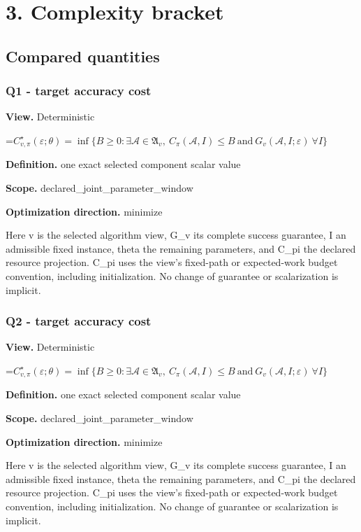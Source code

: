 \documentclass[10pt,a4paper]{article}
\newcommand{\AtlasMath}[1]{\par\begingroup\centering\setbox0=\hbox{$\displaystyle #1$}\ifdim\wd0>1.4\linewidth\typeout{ATLAS WIDE FORMULA: \the\wd0}\fi\ifdim\wd0>\linewidth\resizebox{\linewidth}{!}{\box0}\else\box0\fi\par\endgroup}
\begin{document}
\section{3. Complexity bracket}
\subsection{Compared quantities}
\subsubsection{Q1 - target accuracy cost}
\textbf{View.} Deterministic

\AtlasMath{C^\star_{v,\pi}(\varepsilon;\theta)=\inf\{B\ge0:\exists\mathcal A\in\mathfrak A_v,\ C_\pi(\mathcal A,I)\le B\ \text{and}\ G_v(\mathcal A,I;\varepsilon)\ \forall I\}}
\textbf{Definition.} one exact selected component scalar value

\textbf{Scope.} declared\_joint\_parameter\_window

\textbf{Optimization direction.} minimize

Here v is the selected algorithm view, G\_v its complete success guarantee, I an admissible fixed instance, theta the remaining parameters, and C\_pi the declared resource projection. C\_pi uses the view's fixed-path or expected-work budget convention, including initialization. No change of guarantee or scalarization is implicit.

\subsubsection{Q2 - target accuracy cost}
\textbf{View.} Deterministic

\AtlasMath{C^\star_{v,\pi}(\varepsilon;\theta)=\inf\{B\ge0:\exists\mathcal A\in\mathfrak A_v,\ C_\pi(\mathcal A,I)\le B\ \text{and}\ G_v(\mathcal A,I;\varepsilon)\ \forall I\}}
\textbf{Definition.} one exact selected component scalar value

\textbf{Scope.} declared\_joint\_parameter\_window

\textbf{Optimization direction.} minimize

Here v is the selected algorithm view, G\_v its complete success guarantee, I an admissible fixed instance, theta the remaining parameters, and C\_pi the declared resource projection. C\_pi uses the view's fixed-path or expected-work budget convention, including initialization. No change of guarantee or scalarization is implicit.
\end{document}
